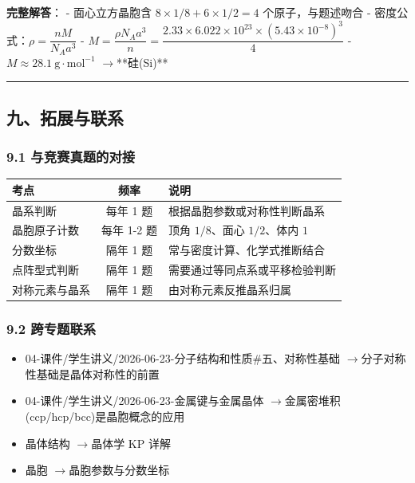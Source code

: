 \documentclass[a4paper,11pt]{ctexart}
\providecommand{\tightlist}{\setlength{\itemsep}{0pt}\setlength{\parskip}{0pt}}
\newcounter{none}
\newcommand{\箭}{\ensuremath{\rightarrow}}
\newcommand{\左箭}{\ensuremath{\leftarrow}}
\newcommand{\上箭}{\ensuremath{\uparrow}}
\newcommand{\下箭}{\ensuremath{\downarrow}}
\newcommand{\衡}{\ensuremath{\rightleftharpoons}}
\newcommand{\双箭}{\ensuremath{\leftrightarrow}}
\newcommand{\约等于}{\ensuremath{\approx}}
\newcommand{\小于等于}{\ensuremath{\leq}}
\newcommand{\大于等于}{\ensuremath{\geq}}
\newcommand{\不等于}{\ensuremath{\neq}}
\newcommand{\西格马}{\ensuremath{\sigma}}
\newcommand{\派}{\ensuremath{\pi}}
\begin{document}
\textbf{完整解答}：
- 面心立方晶胞含 \(8 \times 1/8 + 6 \times 1/2 = 4\) 个原子，与题述吻合
- 密度公式：\(\rho = \dfrac{nM}{N_A a^3}\)
- \(M = \dfrac{\rho N_A a^3}{n} = \dfrac{2.33 \times 6.022\times 10^{23} \times (5.43\times 10^{-8})^3}{4}\)
- \(M \approx 28.1\ \mathrm{g\cdot mol^{-1}}\) \箭 **硅(Si)**

\begin{center}\rule{0.5\linewidth}{0.5pt}\end{center}

\subsection{九、拓展与联系}\label{ux4e5dux62d3ux5c55ux4e0eux8054ux7cfb}

\subsubsection{9.1 与竞赛真题的对接}\label{ux4e0eux7adeux8d5bux771fux9898ux7684ux5bf9ux63a5}

{\def\LTcaptype{none} %
\begin{longtable}[]{@{}lcl@{}}
\toprule\noalign{}
考点 & 频率 & 说明 \\
\midrule\noalign{}
\endhead
\bottomrule\noalign{}
\endlastfoot
晶系判断 & 每年 1 题 & 根据晶胞参数或对称性判断晶系 \\
晶胞原子计数 & 每年 1-2 题 & 顶角 \(1/8\)、面心 \(1/2\)、体内 \(1\) \\
分数坐标 & 隔年 1 题 & 常与密度计算、化学式推断结合 \\
点阵型式判断 & 隔年 1 题 & 需要通过等同点系或平移检验判断 \\
对称元素与晶系 & 隔年 1 题 & 由对称元素反推晶系归属 \\
\end{longtable}
}

\subsubsection{9.2 跨专题联系}\label{ux8de8ux4e13ux9898ux8054ux7cfb}

\begin{itemize}
\tightlist
\item
  04-课件/学生讲义/2026-06-23-分子结构和性质\#五、对称性基础 \箭 分子对称性基础是晶体对称性的前置
\item
  04-课件/学生讲义/2026-06-23-金属键与金属晶体 \箭 金属密堆积(ccp/hcp/bcc)是晶胞概念的应用
\item
  晶体结构 \箭 晶体学 KP 详解
\item
  晶胞 \箭 晶胞参数与分数坐标
\end{itemize}
\end{document}
